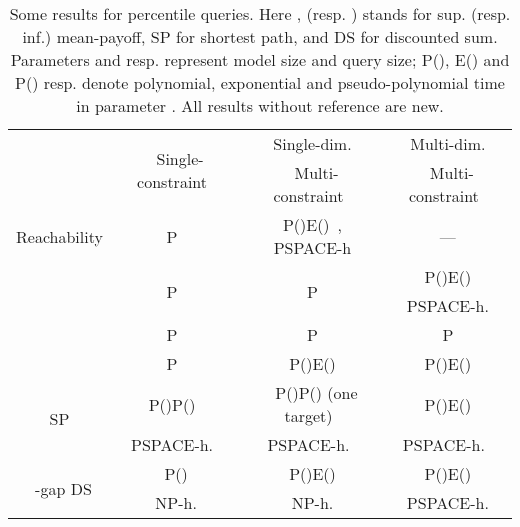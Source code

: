 \documentclass{llncs}
\newcommand\NPTIME{\textrm{\sf NP}}
\newcommand\PTIME{\textrm{\sf P}}
\newcommand\PSPACE{\textrm{\sf PSPACE}}
\begin{document}
\def\arraystretch{1.2}
\begin{table}[t]
  \footnotesize
  \centering
  \begin{tabular}{|c||c|c|c|}
    \cline{2-4} \multicolumn{1}{c||}{} & \multirow{2}{*}{~Single-constraint~} & Single-dim. & ~Multi-dim.~ \\
    \multicolumn{1}{c||}{} & & ~Multi-constraint~ & ~Multi-constraint~\\
    \hline
    \hline
    Reachability & \PTIME~\cite{Puterman-wiley94} & P()E()~\cite{EKVY-lmcs08}, \PSPACE-h & --- \\
    \hline
    \multirow{2}{*}{~~} & \multirow{2}{*}{\PTIME~\cite{CH-ilc09}} & \multirow{2}{*}{\PTIME} & ~P()E()~ \\
    & & & \PSPACE-h.\\
    \hline
    ~ & ~\PTIME~\cite{Puterman-wiley94}~ & \PTIME & \PTIME\\
    \hline
    ~ & ~\PTIME~\cite{Puterman-wiley94}~ & ~P()E()~ & ~P()E()~\\
    \hline
    \multirow{2}{*}{~SP~} &  ~P()P()~\cite{HaaseK14}~ & ~P()P() (one target)~ & ~P()E()~\\
    & ~\PSPACE-h.~\cite{HaaseK14}~ & ~\PSPACE-h.~\cite{HaaseK14}~ & ~\PSPACE-h.~\cite{HaaseK14}~\\
    \hline
    \multirow{2}{*}{~-gap DS} & ~P()~ & ~P()E()~ & ~P()E()~\\
    & \NPTIME-h. & \NPTIME-h. & \PSPACE-h.\\
    \hline
  \end{tabular}
  \vspace{2mm}
  \caption{Some results for percentile queries. Here ,  (resp. ) stands for sup. (resp. inf.) mean-payoff, SP for shortest path, and DS for discounted sum. Parameters  and  resp. represent model size and query size; P(), E() and P() resp. denote polynomial, exponential and pseudo-polynomial time in parameter . All results without reference are new.}
  \vspace{-6mm}
  \label{table}
\end{table}
\end{document}
